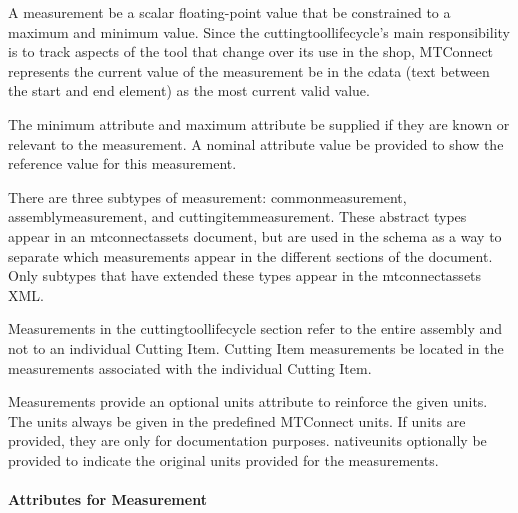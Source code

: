 \documentclass{mtconnect}	%
\begin{document}
\FloatBarrier

A measurement \MUST be a scalar floating-point value that \MAY be constrained to a maximum and minimum value.  Since the \gls{cuttingtoollifecycle}'s main responsibility is to track aspects of the tool that change over its use in the shop, MTConnect represents the current value of the measurement \MUST be in the \gls{cdata} (text between the start and end element) as the most current valid value.

The \gls{minimum attribute} and \gls{maximum attribute} \MAY be supplied if they are known or relevant to the measurement.  A \gls{nominal attribute} value \MAY be provided to show the reference value for this measurement.

There are three subtypes of  \gls{measurement}: \gls{commonmeasurement}, \gls{assemblymeasurement}, and \gls{cuttingitemmeasurement}.  These abstract types \MUSTNOT appear in an \gls{mtconnectassets} document, but are used in the schema as a way to separate which measurements \MAY appear in the different sections of the document.  Only subtypes that have extended these types \MAY appear in the \gls{mtconnectassets} XML.

Measurements in the \gls{cuttingtoollifecycle} section \MUST refer to the entire assembly and not to an individual Cutting Item. Cutting Item measurements \MUST be located in the measurements associated with the individual Cutting Item.

Measurements \MAY provide an optional \gls{units} attribute to reinforce the given units.  The units \MUST always be given in the predefined MTConnect units.  If \gls{units} are provided, they are only for documentation purposes.  \gls{nativeunits} \MAY optionally be provided to indicate the original units provided for the measurements. 

\paragraph{Attributes for Measurement}\mbox{}
\end{document}
